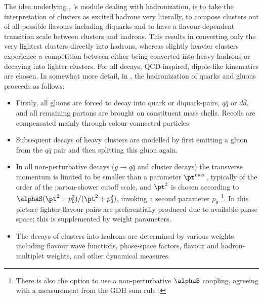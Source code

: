 \mcsubsection{\gensectionhadronize}
\label{Sec:hadronization_sherpa}
The idea underlying \Ahadic, \Sherpa's module dealing with hadronization, 
is to take the interpretation of clusters as excited hadrons very literally, 
to compose clusters out of all possible flavours including diquarks 
and to have a flavour-dependent transition scale between clusters and 
hadrons.   This results in converting only the very lightest clusters 
directly into hadrons, whereas slightly heavier clusters experience a 
competition between either being converted into heavy hadrons or decaying 
into lighter clusters. For all decays, QCD-inspired, dipole-like 
kinematics are chosen. In somewhat more detail, in \Ahadic, the hadronization 
of quarks and gluons proceeds as follows:
\begin{itemize}
\item Firstly, all gluons are forced to decay into quark or diquark-pairs,
  $q\bar q$ or $d\bar d$, and all remaining partons are brought on 
  constituent mass shells.  Recoils are compensated mainly through 
  colour-connected particles.
\item Subsequent decays of heavy clusters are modelled by first emitting 
  a gluon from the $q\bar q$ pair and then splitting this gluon again.
\item In all non-perturbative decays ($g\to q\bar q$ and cluster decays) the 
  transverse momentum is limited to be smaller than a parameter 
  $\pt^{\rm max}$, typically of the order of the parton-shower cutoff 
  scale, and $\pt^2$ is chosen according to 
  $\alphaS(\pt^2+p_0^2)/(\pt^2+p_0^2)$, invoking a second parameter
  $p_0$ \footnote{There is also the option to use a non-perturbative 
    $\alphaS$ coupling, agreeing with a measurement from the GDH sum rule
    \cite{Deur:2008rf}.}.
  In this picture lighter-flavour pairs are preferentially produced due to 
  available phase space; this is supplemented by weight parameters.
\item The decays of clusters into hadrons are determined by various weights 
  including flavour wave functions, phase-space factors, flavour and 
  hadron-multiplet weights, and other dynamical measures.  
\end{itemize}

\mcsubsection{\gensectiondecay}
\label{Sec:decays_sherpa}

